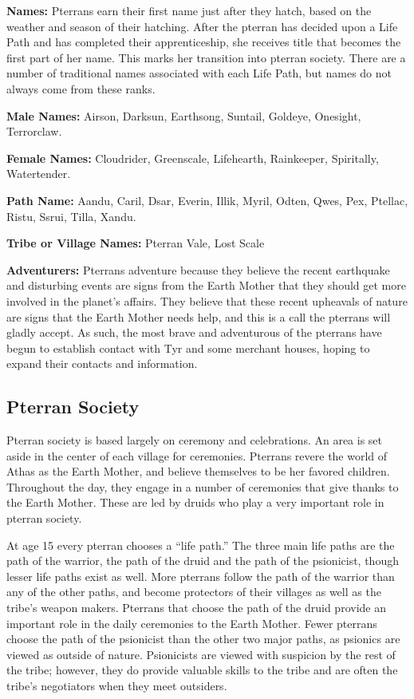\textbf{Names:} Pterrans earn their first name just after they hatch, based on the weather and season of their hatching. After the pterran has decided upon a Life Path and has completed their apprenticeship, she receives title that becomes the first part of her name. This marks her transition into pterran society. There are a number of traditional names associated with each Life Path, but names do not always come from these ranks.

\textbf{Male Names:} Airson, Darksun, Earthsong, Suntail, Goldeye, Onesight, Terrorclaw.

\textbf{Female Names:} Cloudrider, Greenscale, Lifehearth, Rainkeeper, Spiritally, Watertender.

\textbf{Path Name:} Aandu, Caril, Dsar, Everin, Illik, Myril, Odten, Qwes, Pex, Ptellac, Ristu, Ssrui, Tilla, Xandu.

\textbf{Tribe or Village Names:} Pterran Vale, Lost Scale

\textbf{Adventurers:} Pterrans adventure because they believe the recent earthquake and disturbing events are signs from the Earth Mother that they should get more involved in the planet's affairs. They believe that these recent upheavals of nature are signs that the Earth Mother needs help, and this is a call the pterrans will gladly accept. As such, the most brave and adventurous of the pterrans have begun to establish contact with Tyr and some merchant houses, hoping to expand their contacts and information.

\subsection{Pterran Society}
Pterran society is based largely on ceremony and celebrations. An area is set aside in the center of each village for ceremonies. Pterrans revere the world of Athas as the Earth Mother, and believe themselves to be her favored children. Throughout the day, they engage in a number of ceremonies that give thanks to the Earth Mother. These are led by druids who play a very important role in pterran society.


At age 15 every pterran chooses a ``life path.'' The three main life paths are the path of the warrior, the path of the druid and the path of the psionicist, though lesser life paths exist as well. More pterrans follow the path of the warrior than any of the other paths, and become protectors of their villages as well as the tribe's weapon makers. Pterrans that choose the path of the druid provide an important role in the daily ceremonies to the Earth Mother. Fewer pterrans choose the path of the psionicist than the other two major paths, as psionics are viewed as outside of nature. Psionicists are viewed with suspicion by the rest of the tribe; however, they do provide valuable skills to the tribe and are often the tribe's negotiators when they meet outsiders.

